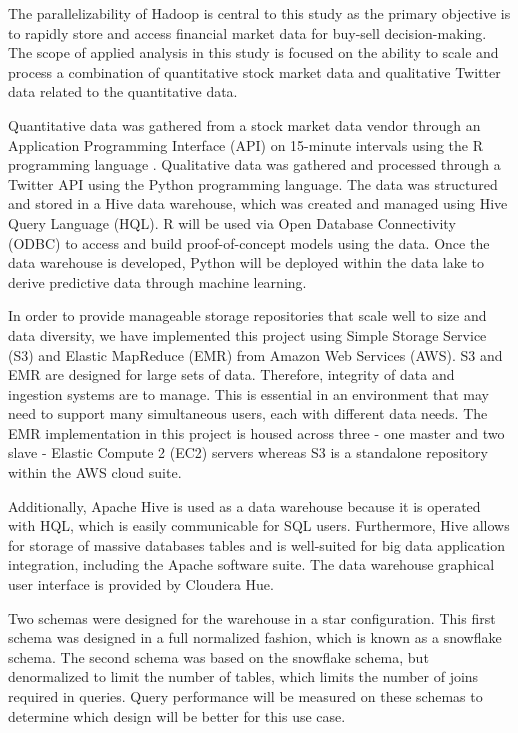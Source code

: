 \documentclass[journal]{IEEEtran}
\begin{document}
The parallelizability of Hadoop is central to this study as the primary
objective is to rapidly store and access financial market data for 
buy-sell decision-making. 
The scope of applied analysis in this study is focused on the ability to
scale and process a combination of quantitative stock market data and
qualitative Twitter data related to the quantitative data. 

Quantitative data was gathered from a stock market data vendor through an
Application Programming Interface (API) on 15-minute intervals using the R
programming language \cite{R}. 
Qualitative data was gathered and processed through a Twitter API
using the Python programming language. 
The data was structured and stored in a Hive data warehouse, 
which was created and managed using Hive Query Language (HQL).
R will be used via Open Database Connectivity (ODBC) to access and
build proof-of-concept models using the data. 
Once the data warehouse is developed,
Python will be deployed within the data lake to
derive predictive data through machine learning.

In order to provide manageable storage repositories that scale well to size and
data diversity, we have implemented this project using Simple Storage Service (S3)
and Elastic MapReduce (EMR) from Amazon Web Services (AWS). 
S3 and EMR are designed for large sets of data. 
Therefore, integrity of data and ingestion systems are to manage. 
This is essential in an environment that may need to support many simultaneous users,
each with different data needs. 
The EMR implementation in this project is housed across three 
- one master and two slave - Elastic Compute 2 (EC2) servers 
whereas S3 is a standalone repository within the AWS cloud suite.

Additionally, Apache Hive is used as a data warehouse 
because it is operated with HQL, 
which is easily communicable for SQL users. 
Furthermore, Hive allows for storage of massive databases tables and
is well-suited for big data application integration, 
including the Apache software suite. 
The data warehouse graphical user interface is provided by Cloudera Hue.

Two schemas were designed for the warehouse in a star configuration.
This first schema was designed in a full normalized fashion,
which is known as a snowflake schema.
The second schema was based on the snowflake schema, 
but denormalized to limit the number of tables, 
which limits the number of joins required in queries.
Query performance will be measured on these schemas to determine
which design will be better for this use case. 
\end{document}
